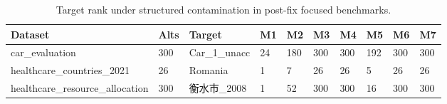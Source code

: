 \begin{table}[htbp]
\centering
\small
\caption{Target rank under structured contamination in post-fix focused benchmarks.}
\label{tab:post_fix_target_rank}
\begin{tabular}{llllllllll}
\hline
Dataset & Alts & Target & M1 & M2 & M3 & M4 & M5 & M6 & M7 \\
\hline
car\_evaluation & 300 & Car\_1\_unacc & 24 & 180 & 300 & 300 & 192 & 300 & 300 \\
healthcare\_countries\_2021 & 26 & Romania & 1 & 7 & 26 & 26 & 5 & 26 & 26 \\
healthcare\_resource\_allocation & 300 & 衡水市\_2008 & 1 & 52 & 300 & 300 & 16 & 300 & 300 \\
\hline
\end{tabular}
\end{table}
